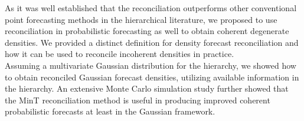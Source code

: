 \documentclass[a4paper, 11pt]{article}
\begin{document}
\noindent
As it was well established that the reconciliation outperforms other conventional point forecasting methods in the hierarchical literature, we proposed to use reconciliation in probabilistic forecasting as well to obtain coherent degenerate densities. We provided a distinct definition for density forecast reconciliation and how it can be used to reconcile incoherent densities in practice.\\

\noindent
Assuming a multivariate Gaussian distribution for the hierarchy, we showed how to obtain reconciled Gaussian forecast densities, utilizing available information in the hierarchy. An extensive Monte Carlo simulation study further showed that the MinT reconciliation method \citep{Wickramasuriya2017} is useful in producing improved coherent probabilistic forecasts at least in the Gaussian framework.    

 







   



\newpage
\printbibliography
\end{document}
